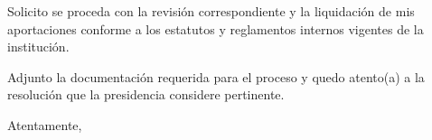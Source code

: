 \documentclass[a4paper,12pt]{article}
\begin{document}
\noindent Solicito se proceda con la revisión correspondiente y la liquidación de mis aportaciones conforme a los estatutos y reglamentos internos vigentes de la institución.

\vspace{0.5cm}

\noindent Adjunto la documentación requerida para el proceso y quedo atento(a) a la resolución que la presidencia considere pertinente.

\noindent Atentamente,

\vspace{2.5cm}


\noindent{}  

\noindent{}      

\noindent{}  

\noindent{} 
\end{document}
